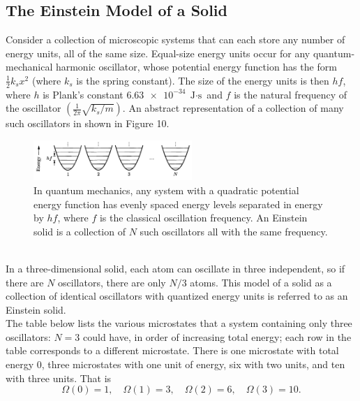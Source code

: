 \documentclass[11pt]{exam}
\begin{document}
\subsection{The Einstein Model of a Solid}
Consider a collection of microscopic systems that can each store any number of energy units, all of the same size. Equal-size energy units occur for any quantum-mechanical harmonic oscillator, whose potential energy function has the form $\frac{1}{2}k_sx^2$ (where $k_s$ is the spring constant). The size of the energy units is then $hf$, where $h$ is Plank's constant $\num{6.63e-34}\;\text{J$\cdot$s}$ and $f$ is the natural frequency of the oscillator $(\frac{1}{2\pi}\sqrt{k_s/m})$. An abstract representation of a collection of many such oscillators in shown in Figure 10. 
\begin{figure}[htp]
    \centering
    \includegraphics[width=6cm]{figure10.png}
    \caption{In quantum mechanics, any system with a quadratic potential energy function has evenly spaced energy levels separated in energy by $hf$, where $f$ is the classical oscillation frequency. An Einstein solid is a collection of $N$ such oscillators all with the same frequency.}
\label{fig:einstein-solid}
\end{figure}\\
\hspace*{10mm}In a three-dimensional solid, each atom can oscillate in three independent, so if there are $N$ oscillators, there are only $N/3$ atoms. This model of a solid as a collection of identical oscillators with quantized energy units is referred to as an Einstein solid.\\
\hspace*{10mm}The table below lists the various microstates that a system containing only three oscillators: $N=3$ could have, in order of increasing total energy; each row in the table corresponds to a different microstate. There is one microstate with total energy 0, three microstates with one unit of energy, six with two units, and ten with three units. That is 
\begin{equation}\tag{2.8}
\Omega(0) = 1,\quad\Omega(1) = 3,\quad\Omega(2) = 6,\quad\Omega(3) = 10.
\end{equation}
\end{document}
